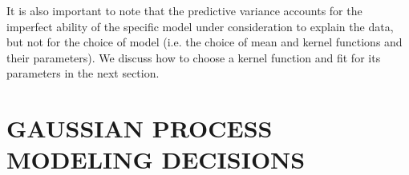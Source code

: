 \documentclass[letterpaper]{ar-1col}
\begin{document}
It is also important to note that the predictive variance accounts for the imperfect ability of the specific model under consideration to explain the data, but not for the choice of model (i.e. the choice of mean and kernel functions and their parameters). We discuss how to choose a kernel function and fit for its parameters in the next section.

\section{GAUSSIAN PROCESS MODELING DECISIONS}
\label{sec:choices}




\end{document}
